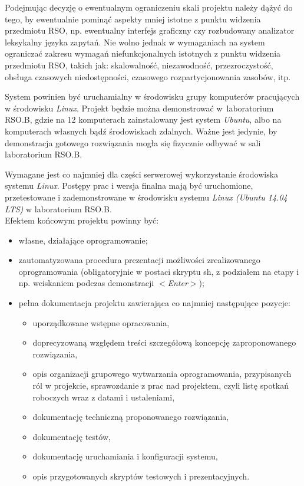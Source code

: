 \documentclass[a4paper,11pt]{article}
\begin{document}
  Podejmując decyzję o ewentualnym ograniczeniu skali projektu należy dążyć do tego, by ewentualnie pominąć aspekty mniej istotne z punktu widzenia przedmiotu RSO,
  np. ewentualny interfejs graficzny czy rozbudowany analizator leksykalny języka zapytań.
  Nie wolno jednak w wymaganiach na system ograniczać zakresu wymagań niefunkcjonalnych istotnych z punktu widzenia przedmiotu RSO,
  takich jak: skalowalność, niezawodność, przezroczystość, obsługa czasowych niedostępności, czasowego rozpartycjonowania zasobów, itp.
  
  System powinien być uruchamialny w środowisku grupy komputerów pracujących w środowisku \textit{Linux}.
  Projekt będzie można demonstrować w~laboratorium RSO.B, gdzie na 12 komputerach zainstalowany jest system \textit{Ubuntu}, albo na komputerach własnych bądź środowiskach zdalnych.
  Ważne jest jedynie, by demonstracja gotowego rozwiązania mogła się fizycznie odbywać w sali laboratorium RSO.B.
  
  Wymagane jest co najmniej dla części serwerowej wykorzystanie środowiska systemu \textit{Linux}.
  Postępy prac i wersja finalna mają być uruchomione, przetestowane i zademonstrowane w środowisku systemu \textit{Linux (Ubuntu 14.04 LTS)} w laboratorium RSO.B. \\
  
  Efektem końcowym projektu powinny być:
  
  \begin{itemize}
    \item własne, działające oprogramowanie;
    \item zautomatyzowana procedura prezentacji możliwości zrealizowanego \linebreak oprogramowania  
      (obligatoryjnie w postaci skryptu sh, z podziałem na etapy i np. wciskaniem podczas demonstracji \textit{$<$Enter$>$});
    \item pełna dokumentacja projektu zawierająca co najmniej następujące pozycje:
    \begin{itemize}
      \item uporządkowane wstępne opracowania,
      \item doprecyzowaną względem treści szczegółową koncepcję zaproponowanego rozwiązania,
      \item opis organizacji grupowego wytwarzania oprogramowania, przypisanych ról w projekcie, sprawozdanie z prac nad projektem, czyli listę spotkań roboczych wraz z datami i ustaleniami,
      \item dokumentację techniczną proponowanego rozwiązania,
      \item dokumentację testów,
      \item dokumentację uruchamiania i konfiguracji systemu,
      \item opis przygotowanych skryptów testowych i prezentacyjnych.
    \end{itemize}
  \end{itemize}
  
\end{document}
